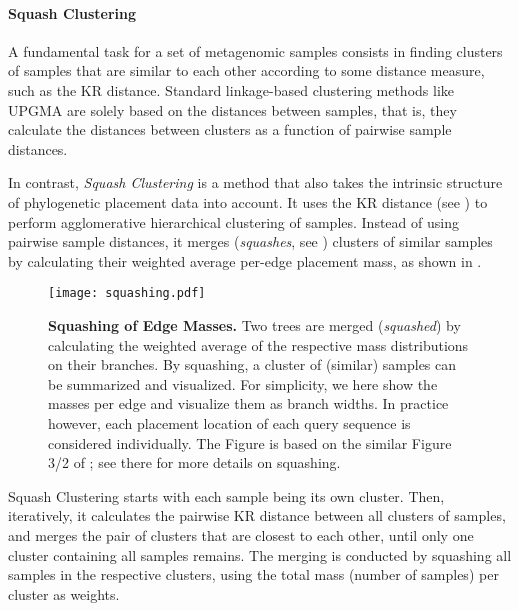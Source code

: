 \paragraph{Squash Clustering}
\label{ch:Foundations:sec:PhylogeneticPlacement:sub:ExistingMethods:par:SquashClustering}


 \cite{Death2002}

A fundamental task for a set of metagenomic samples consists in
finding clusters of samples that are similar to each other according to some distance measure, such as the KR distance.
Standard linkage-based clustering methods like \mbox{UPGMA} %
are solely based on the distances between samples,
that is, they calculate the distances between clusters as a function of pairwise sample distances.

In contrast, \emph{Squash Clustering} \cite{Matsen2011a} is a method that
also takes the intrinsic structure of phylogenetic placement data into account.
It uses the KR distance (see )
to perform agglomerative hierarchical clustering of samples.
Instead of using pairwise sample distances, it merges
(\emph{squashes}, see )
clusters of similar samples by calculating their weighted average per-edge placement mass,
as shown in .

\begin{figure}[!htb]
    \centering
    \texttt{[image: squashing.pdf]}
    \caption[Squashing of Edge Masses]{
        \textbf{Squashing of Edge Masses.}
        Two trees are merged (\emph{squashed}) by calculating the weighted average
        of the respective mass distributions on their branches.
        By squashing, a cluster of (similar) samples can be summarized and visualized.
        For simplicity, we here show the masses per edge and visualize them as branch widths.
        In practice however, each placement location of each query sequence is considered individually.
        The Figure is based on the similar Figure 3/2 of \cite{Matsen2011a}; see there for more details on squashing.
    }
    \label{fig:squashing}
\end{figure}

Squash Clustering starts with each sample being its own cluster.
Then, iteratively, it calculates the pairwise KR distance between all clusters of samples,
and merges the pair of clusters that are closest to each other,
until only one cluster containing all samples remains.
The merging is conducted by squashing all samples in the respective clusters,
using the total mass (number of samples) per cluster as weights.

